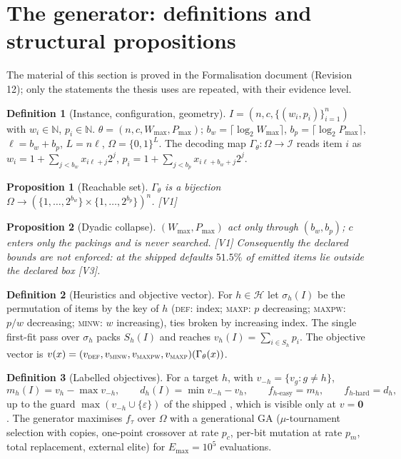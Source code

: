 \documentclass[a4paper,11pt]{article}
\newcommand{\Wmax}{W_{\max}}
\newcommand{\Pmax}{P_{\max}}
\newcommand{\Emax}{E_{\max}}
\newcommand{\bw}{b_{w}}
\newcommand{\bp}{b_{p}}
\newcommand{\Gam}{\Gamma_{\theta}}
\newcommand{\Om}{\Omega}
\newcommand{\inst}{\mathcal{I}}
\newcommand{\heur}{\mathcal{H}}
\newcommand{\code}[1]{\path{#1}}
\newcommand{\DEF}{\textsc{def}}
\newcommand{\MAXP}{\textsc{maxp}}
\newcommand{\MAXPW}{\textsc{maxpw}}
\newcommand{\MINW}{\textsc{minw}}
\newcommand{\evid}[1]{\textcolor{inkSoft}{\scriptsize[#1]}}
\theoremstyle{plain}
\newtheorem{proposition}{Proposition}
\theoremstyle{definition}
\newtheorem{definition}{Definition}
\theoremstyle{remark}
\begin{document}
\section{The generator: definitions and structural propositions}\label{sec:artefact}

The material of this section is proved in the Formalisation document (Revision 12); only
the statements the thesis uses are repeated, with their evidence level.

\begin{definition}[Instance, configuration, geometry]
$I=(n,c,\{(w_i,p_i)\}_{i=1}^{n})$ with $w_i\in\mathbb N$, $p_i\in\mathbb N$.
$\theta=(n,c,\Wmax,\Pmax)$; $\bw=\lceil\log_2\Wmax\rceil$, $\bp=\lceil\log_2\Pmax\rceil$,
$\ell=\bw+\bp$, $L=n\ell$, $\Om=\{0,1\}^{L}$. The decoding map $\Gam:\Om\to\inst$ reads
item $i$ as $w_i=1+\sum_{j<\bw}x_{i\ell+j}2^{j}$, $p_i=1+\sum_{j<\bp}x_{i\ell+\bw+j}2^{j}$.
\end{definition}

\begin{proposition}[Reachable set]\label{prop:reach}
$\Gam$ is a bijection $\Om\to(\{1,\dots,2^{\bw}\}\times\{1,\dots,2^{\bp}\})^{n}$. \evid{V1}
\end{proposition}

\begin{proposition}[Dyadic collapse]\label{prop:dyadic}
$(\Wmax,\Pmax)$ act only through $(\bw,\bp)$; $c$ enters only the packings and is never
searched. \evid{V1} Consequently the declared bounds are not enforced: at the shipped
defaults $51.5\%$ of emitted items lie outside the declared box \evid{V3}.
\end{proposition}

\begin{definition}[Heuristics and objective vector]
For $h\in\heur$ let $\sigma_h(I)$ be the permutation of items by the key of $h$
(\DEF: index; \MAXP: $p$ decreasing; \MAXPW: $p/w$ decreasing; \MINW: $w$ increasing), ties
broken by increasing index. The single first-fit pass over $\sigma_h$ packs
$S_h(I)$ and reaches $v_h(I)=\sum_{i\in S_h}p_i$. The objective vector is
$v(x)=(v_{\DEF},v_{\MINW},v_{\MAXPW},v_{\MAXP})(\Gam(x))$.
\end{definition}

\begin{definition}[Labelled objectives]\label{def:labelled}
For a target $h$, with $v_{-h}=\{v_g:g\ne h\}$,
\[
m_h(I)=v_h-\max v_{-h},\qquad d_h(I)=\min v_{-h}-v_h,\qquad
f_{h\text{-easy}}=m_h,\qquad f_{h\text{-hard}}=d_h,
\]
up to the guard $\max(v_{-h}\cup\{\varepsilon\})$ of the shipped \code{Statistical.max},
which is visible only at $v=\mathbf 0$. The generator maximises $f_\tau$ over $\Om$ with a
generational GA ($\mu$-tournament selection with copies, one-point crossover at rate $p_c$,
per-bit mutation at rate $p_m$, total replacement, external elite) for $\Emax=10^{5}$
evaluations.
\end{definition}
\end{document}
